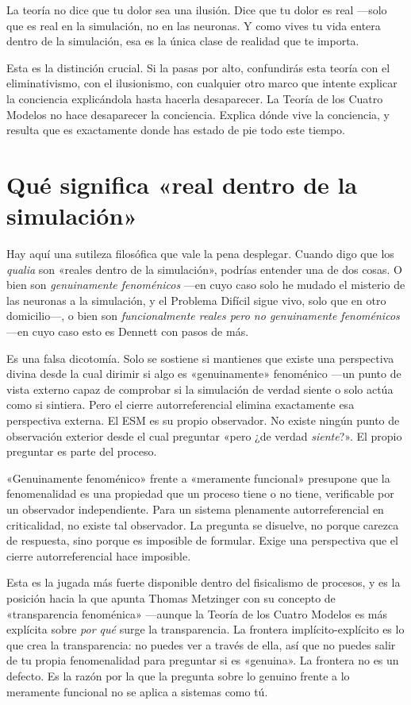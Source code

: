 \documentclass[11pt, twoside, openright]{book}
\begin{document}
La teoría no dice que tu dolor sea una ilusión. Dice que tu dolor es real ---solo que es real en la simulación, no en las neuronas. Y como vives tu vida entera dentro de la simulación, esa es la única clase de realidad que te importa.

Esta es la distinción crucial. Si la pasas por alto, confundirás esta teoría con el eliminativismo, con el ilusionismo, con cualquier otro marco que intente explicar la conciencia explicándola hasta hacerla desaparecer. La Teoría de los Cuatro Modelos no hace desaparecer la conciencia. Explica dónde vive la conciencia, y resulta que es exactamente donde has estado de pie todo este tiempo.

\section*{Qué significa «real dentro de la simulación»}

Hay aquí una sutileza filosófica que vale la pena desplegar. Cuando digo que los \textit{qualia} son «reales dentro de la simulación», podrías entender una de dos cosas. O bien son \textit{genuinamente fenoménicos} ---en cuyo caso solo he mudado el misterio de las neuronas a la simulación, y el Problema Difícil sigue vivo, solo que en otro domicilio---, o bien son \textit{funcionalmente reales pero no genuinamente fenoménicos} ---en cuyo caso esto es Dennett con pasos de más.

Es una falsa dicotomía. Solo se sostiene si mantienes que existe una perspectiva divina desde la cual dirimir si algo es «genuinamente» fenoménico ---un punto de vista externo capaz de comprobar si la simulación de verdad siente o solo actúa como si sintiera. Pero el cierre autorreferencial elimina exactamente esa perspectiva externa. El ESM es su propio observador. No existe ningún punto de observación exterior desde el cual preguntar «pero ¿de verdad \textit{siente}?». El propio preguntar es parte del proceso.

«Genuinamente fenoménico» frente a «meramente funcional» presupone que la fenomenalidad es una propiedad que un proceso tiene o no tiene, verificable por un observador independiente. Para un sistema plenamente autorreferencial en criticalidad, no existe tal observador. La pregunta se disuelve, no porque carezca de respuesta, sino porque es imposible de formular. Exige una perspectiva que el cierre autorreferencial hace imposible.

Esta es la jugada más fuerte disponible dentro del fisicalismo de procesos, y es la posición hacia la que apunta Thomas Metzinger con su concepto de «transparencia fenoménica» ---aunque la Teoría de los Cuatro Modelos es más explícita sobre \textit{por qué} surge la transparencia. La frontera implícito-explícito es lo que crea la transparencia: no puedes ver a través de ella, así que no puedes salir de tu propia fenomenalidad para preguntar si es «genuina». La frontera no es un defecto. Es la razón por la que la pregunta sobre lo genuino frente a lo meramente funcional no se aplica a sistemas como tú.
\end{document}
